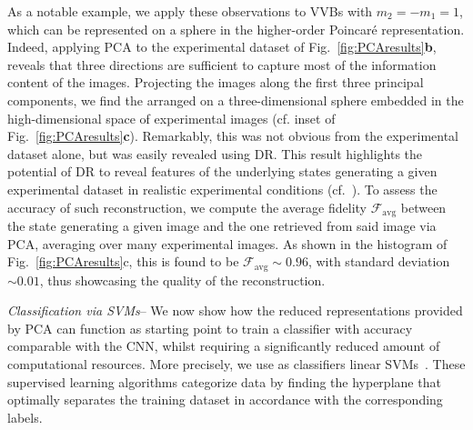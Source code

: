 \documentclass[
	aps, prl, superscriptaddress, twocolumn,
	10pt
	floatfix, 
    nofootinbib,
	tightenlines
]{revtex4-1}
\begin{document}
As a notable example, we apply these observations to \acp{VVB} with $m_2=-m_1=1$, which can be represented on a sphere in the higher-order Poincar\'e representation. 
Indeed, applying PCA to the experimental dataset of Fig.~\ref{fig:PCAresults}{\bf b}, reveals that three directions are sufficient to capture most of the information content of the images. Projecting the images along the first three principal components, we find the arranged on a three-dimensional sphere embedded in the high-dimensional space of experimental images (cf. inset of Fig.~\ref{fig:PCAresults}{\bf c}).
Remarkably, this was not obvious from the experimental dataset alone, but was easily revealed using \ac{DR}. This result highlights the potential of \ac{DR} to reveal features of the underlying states generating a given experimental dataset in realistic experimental conditions (cf.~\cite{SI}).
To assess the accuracy of such reconstruction, we compute the average fidelity $\mathcal F_{\text{avg}}$ between the state generating a given image and the one retrieved from said image via PCA, averaging over many experimental images.
As shown in the histogram of Fig.~\ref{fig:PCAresults}c, this is found to be $\mathcal F_{\text{avg}}\sim0.96$, with standard deviation $\sim0.01$, thus showcasing the quality of the reconstruction.

\textit{Classification via SVMs}-- We now show how the reduced representations provided by \ac{PCA} can function as starting point to train a classifier with accuracy comparable with the \ac{CNN}, whilst requiring a significantly reduced amount of computational resources.
More precisely, we use as classifiers linear \acp{SVM}~\cite{hearst1998svm}. These supervised learning algorithms categorize data by finding the hyperplane that optimally separates the training dataset in accordance with the corresponding labels. 
\end{document}
